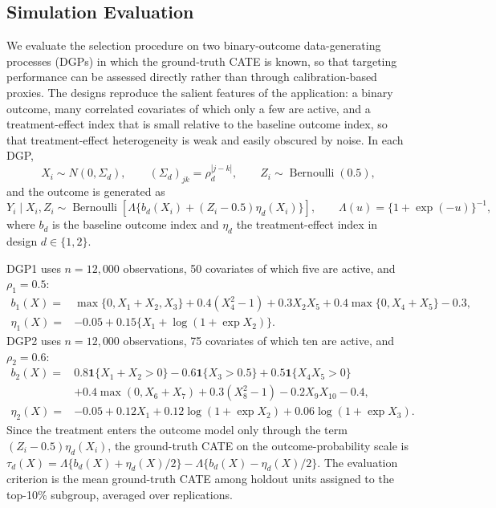 \documentclass[12pt]{article}
\newcommand{\TargetFrac}{10{\%}\xspace}
\begin{document}
\subsection{Simulation Evaluation}
\label{subsec:simulation_evaluation}

We evaluate the selection procedure on two binary-outcome data-generating processes (DGPs) in which the ground-truth CATE is known, so that targeting performance can be assessed directly rather than through calibration-based proxies. The designs reproduce the salient features of the application: a binary outcome, many correlated covariates of which only a few are active, and a treatment-effect index that is small relative to the baseline outcome index, so that treatment-effect heterogeneity is weak and easily obscured by noise. In each DGP,
\[
X_i\sim N(0,\Sigma_d),\qquad (\Sigma_d)_{jk}=\rho_d^{|j-k|},\qquad
Z_i\sim\operatorname{Bernoulli}(0.5),
\]
and the outcome is generated as
\[
Y_i\mid X_i,Z_i\sim\operatorname{Bernoulli}\!\left[
\Lambda\{b_d(X_i)+(Z_i-0.5)\eta_d(X_i)\}\right],
\qquad \Lambda(u)=\{1+\exp(-u)\}^{-1},
\]
where $b_d$ is the baseline outcome index and $\eta_d$ the treatment-effect index in design $d\in\{1,2\}$.

DGP1 uses $n=12{,}000$ observations, 50 covariates of which five are active, and $\rho_1=0.5$:
\begin{align*}
b_1(X)={}&\max\{0,X_1+X_2,X_3\}+0.4(X_4^2-1)+0.3X_2X_5
          +0.4\max\{0,X_4+X_5\}-0.3,\\
\eta_1(X)={}&-0.05+0.15\{X_1+\log(1+\exp X_2)\}.
\end{align*}
DGP2 uses $n=12{,}000$ observations, 75 covariates of which ten are active, and $\rho_2=0.6$:
\begin{align*}
b_2(X)={}&0.8\mathbf 1\{X_1+X_2>0\}-0.6\mathbf 1\{X_3>0.5\}
          +0.5\mathbf 1\{X_4X_5>0\}\\
&+0.4\max(0,X_6+X_7)+0.3(X_8^2-1)-0.2X_9X_{10}-0.4,\\
\eta_2(X)={}&-0.05+0.12X_1+0.12\log(1+\exp X_2)
            +0.06\log(1+\exp X_3).
\end{align*}
Since the treatment enters the outcome model only through the term $(Z_i-0.5)\eta_d(X_i)$, the ground-truth CATE on the outcome-probability scale is
$\tau_d(X)=\Lambda\{b_d(X)+\eta_d(X)/2\}-\Lambda\{b_d(X)-\eta_d(X)/2\}$. The evaluation criterion is the mean ground-truth CATE among holdout units assigned to the top-\TargetFrac subgroup, averaged over replications.
\end{document}
